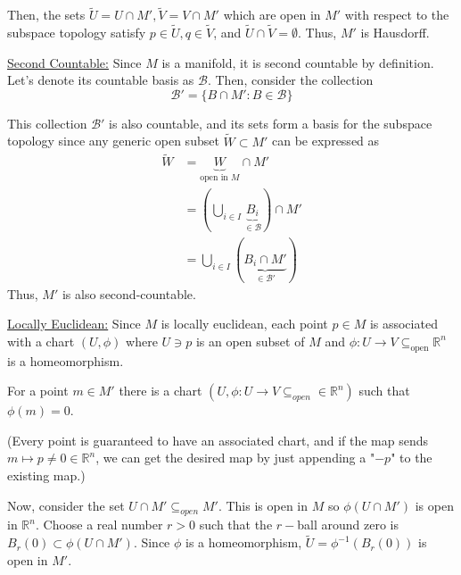 \documentclass{article}
\newcommand{\R}{\mathbb{R}}
\newcommand{\restr}[2]{{%
  \left.\kern-\nulldelimiterspace %
  #1 %
  \vphantom{\big|} %
  \right|_{#2} %
  }}
\begin{document}
\vskip 0.25cm
Then, the sets $\tilde{U} = U \cap M', \tilde{V} = V \cap M'$ which are open in $M'$ with respect to the subspace topology satisfy $p \in \tilde{U}, q \in \tilde{V}$, and $\tilde{U} \cap \tilde{V} = \emptyset$. Thus, $M'$ is Hausdorff.

\vskip 0.5cm
\underline{Second Countable:} Since $M$ is a manifold, it is second countable by definition. Let's denote its countable basis as $\mathcal B$. Then, consider the collection
\[ \mathcal{B}' = \{ B \cap M' : B \in \mathcal B \} \]

This collection $\mathcal{B}'$ is also countable, and its sets form a basis for the subspace topology since any generic open subset $\tilde{W} \subset M'$ can be expressed as 
\begin{align*}
  \tilde{W} &= \underbrace{W}_{\text{open in $M$}} \cap M' \\
  &= \left( \bigcup_{i \in I} \underbrace{B_i}_{\in \mathcal B} \right) \cap M'\\
  &= \bigcup_{i \in I} \left( \underbrace{B_i \cap M'}_{\in \mathcal{B}'} \right) 
\end{align*}
Thus, $M'$ is also second-countable.

\vskip 0.5cm
\underline{Locally Euclidean:} Since $M$ is locally euclidean, each point $p \in M$ is associated with a chart $(U, \phi)$ where $U \ni p$ is an open subset of $M$ and $\phi : U \rightarrow V \subseteq_{\text{open}} \mathbb{R}^n$ is a homeomorphism. 

\vskip 0.25cm

For a point $m \in M'$ there is a chart $(U, \phi : U \rightarrow V \subseteq_{open} \in \R^n)$ such that $\phi(m) = 0$.

\begin{dottedbox}
(Every point is guaranteed to have an associated chart, and if the map sends $m \mapsto p \neq 0 \in \R^n$, we can get the desired map by just appending a "$-p$" to the existing map.)
\end{dottedbox}


\vskip 0.25cm
Now, consider the set $U \cap M' \subseteq_{open} M'$. This is open in $M$ so $\phi(U \cap M')$ is open in $\R^n$. Choose a real number $r > 0$ such that the $r-$ball around zero is $B_r(0) \subset \phi(U \cap M')$. Since $\phi$ is a homeomorphism, $\tilde{U} = \phi^{-1}(B_r(0))$ is open in $M'$.
\end{document}

